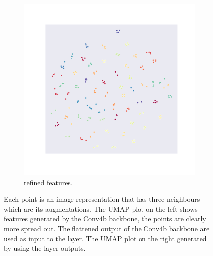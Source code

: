 \begin{figure}[t]
\begin{subfigure}[b]{0.4\textwidth}
         \includegraphics[width=\textwidth, trim=2.55cm 3cm 2.6cm 2.6cm, clip]{chapters/assets/samptr_extra/gnn_emb.pdf}
         \caption{\samp{} refined features.}
     \end{subfigure}
     \caption{ Each point is an image representation that has three neighbours which are its augmentations. The UMAP plot on the left shows features generated by the Conv$4$b backbone, the points are clearly more spread out. The flattened output of the Conv$4$b backbone are used as input to the \samp{} layer. The UMAP plot on the right generated by using the \samp{} layer outputs.
     }
     \label{fig:samp-training-emb-plots}
\end{figure}
